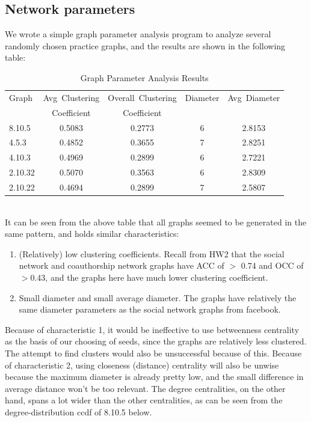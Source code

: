 \documentclass[12pt]{article}
\begin{document}
\subsection{Network parameters}
We wrote a simple graph parameter analysis program to analyze several randomly chosen practice graphs, and the results are shown in the following table:
\begin{table}[ht]
\caption{Graph Parameter Analysis Results}
\centering
\begin{tabular}{l c c c c}
\hline\hline
Graph & Avg\ Clustering& Overall\ Clustering & Diameter & Avg\ Diameter \\ 
            & Coefficient         & Coefficient               &  &  \\ 
\hline\hline
8.10.5 & 0.5083 & 0.2773 & 6 & 2.8153\\
4.5.3 & 0.4852 & 0.3655 & 7 & 2.8251\\
4.10.3 & 0.4969 & 0.2899 & 6 & 2.7221\\
2.10.32 & 0.5070 & 0.3563 & 6 & 2.8309\\
2.10.22 & 0.4694 & 0.2899 & 7 & 2.5807\\
\hline
\end{tabular}
\end{table}\\
It can be seen from the above table that all graphs seemed to be generated in the same pattern, and holds similar characteristics:
\begin{enumerate}
\item (Relatively) low clustering coefficients. Recall from HW2 that the social network and coauthorship network graphs have ACC of $>$ 0.74 and OCC of $>$0.43, and the graphs here have much lower clustering coefficient. 
\item Small diameter and small average diameter. The graphs have relatively the same diameter parameters as the social network graphs from facebook.
\end{enumerate}
Because of characteristic 1, it would be ineffective to use betweenness centrality as the basis of our choosing of seeds, since the graphs are relatively less clustered. The attempt to find clusters would also be unsuccessful because of this. 
Because of characteristic 2, using closeness (distance) centrality will also be unwise because the maximum diameter is already pretty low, and the small difference in average distance won't be too relevant. 
The degree centralities, on the other hand, spans a lot wider than the other centralities, as can be seen from the degree-distribution ccdf of 8.10.5 below.
\end{document}
